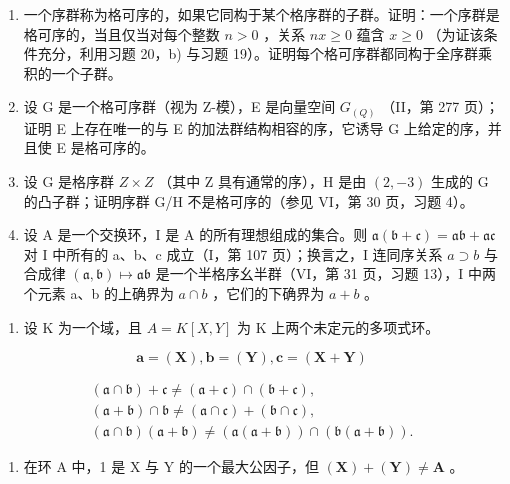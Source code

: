 \begin{enumerate}
\def\labelenumi{\arabic{enumi})}
\setcounter{enumi}{20}
\item
  一个序群称为格可序的，如果它同构于某个格序群的子群。证明：一个序群是格可序的，当且仅当对每个整数 \(n > 0\) ，关系 \(nx \geqslant 0\) 蕴含 \(x \geqslant 0\) （为证该条件充分，利用习题 20，b) 与习题 19）。证明每个格可序群都同构于全序群乘积的一个子群。
\item
  设 G 是一个格可序群（视为 Z-模），E 是向量空间 \(G_{(Q)}\) （II，第 277 页）；证明 E 上存在唯一的与 E 的加法群结构相容的序，它诱导 G 上给定的序，并且使 E 是格可序的。
\item
  设 G 是格序群 \(Z \times Z\) （其中 Z 具有通常的序），H 是由 \((2, -3)\) 生成的 G 的凸子群；证明序群 G/H 不是格可序的（参见 VI，第 30 页，习题 4）。
\item
  设 A 是一个交换环，I 是 A 的所有理想组成的集合。则 \(\mathfrak{a}(\mathfrak{b} + \mathfrak{c}) = \mathfrak{a}\mathfrak{b} + \mathfrak{a}\mathfrak{c}\) 对 I 中所有的 a、b、c 成立（I，第 107 页）；换言之，I 连同序关系 \(a \supset b\) 与合成律 \((\mathfrak{a}, \mathfrak{b}) \mapsto \mathfrak{a}\mathfrak{b}\) 是一个半格序幺半群（VI，第 31 页，习题 13），I 中两个元素 a、b 的上确界为 \(a \cap b\) ，它们的下确界为 \(a + b\) 。
\end{enumerate}

\begin{enumerate}
\def\labelenumi{\alph{enumi})}
\tightlist
\item
  设 K 为一个域，且 \(A = K[X, Y]\) 为 K 上两个未定元的多项式环。
\end{enumerate}

\[
\mathbf {a} = (\mathbf {X}), \mathbf {b} = (\mathbf {Y}), \mathbf {c} = (\mathbf {X} + \mathbf {Y})
\]

\[
\begin{array}{c} (\mathfrak {a} \cap \mathfrak {b}) + \mathfrak {c} \neq (\mathfrak {a} + \mathfrak {c}) \cap (\mathfrak {b} + \mathfrak {c}), \\ (\mathfrak {a} + \mathfrak {b}) \cap \mathfrak {b} \neq (\mathfrak {a} \cap \mathfrak {c}) + (\mathfrak {b} \cap \mathfrak {c}), \\ (\mathfrak {a} \cap \mathfrak {b}) (\mathfrak {a} + \mathfrak {b}) \neq (\mathfrak {a} (\mathfrak {a} + \mathfrak {b})) \cap (\mathfrak {b} (\mathfrak {a} + \mathfrak {b})). \end{array}
\]

\begin{enumerate}
\def\labelenumi{\alph{enumi})}
\setcounter{enumi}{1}
\tightlist
\item
  在环 A 中，1 是 X 与 Y 的一个最大公因子，但 \((\mathbf{X}) + (\mathbf{Y}) \neq \mathbf{A}\) 。
\end{enumerate}

